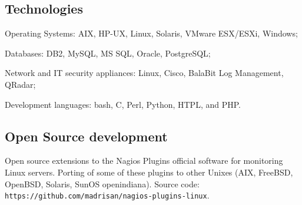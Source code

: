 \subsection{Technologies}

\item{\bdot} Operating Systems: AIX, HP-UX, Linux, Solaris, VMware ESX/ESXi, Windows;
\item{\bdot} Databases: DB2, MySQL, MS SQL, Oracle, PostgreSQL;
\item{\bdot} Network and IT security appliances: Linux, Cisco, BalaBit Log Management, 
   QRadar;
\item{\bdot} Development languages: bash, C, Perl, Python, HTPL, and PHP.

\subsection{Open Source development}

Open source extensions to the Nagios Plugins official software for monitoring
Linux servers.
Porting of some of these plugins to other Unixes
(AIX, FreeBSD, OpenBSD, Solaris, SunOS openindiana).
Source code:
{\tt https://github.com/madrisan/nagios-plugins-linux}.


%
%
%
%

